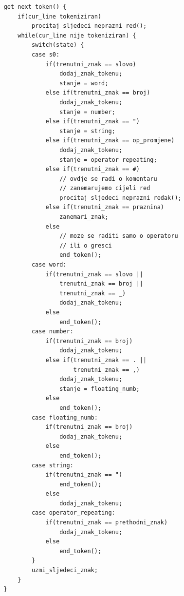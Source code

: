 \documentclass[times, utf8, zavrsni]{fer}
\begin{document}
\begin{verbatim}
    get_next_token() {
        if(cur_line tokeniziran)
            procitaj_sljedeci_neprazni_red();
        while(cur_line nije tokeniziran) {
            switch(state) {
            case s0:
                if(trenutni_znak == slovo)
                    dodaj_znak_tokenu;
                    stanje = word;
                else if(trenutni_znak == broj)
                    dodaj_znak_tokenu;
                    stanje = number;
                else if(trenutni_znak == ")
                    stanje = string;
                else if(trenutni_znak == op_promjene)
                    dodaj_znak_tokenu;
                    stanje = operator_repeating;
                else if(trenutni_znak == #)
                    // ovdje se radi o komentaru
                    // zanemarujemo cijeli red
                    procitaj_sljedeci_neprazni_redak(); 
                else if(trenutni_znak == praznina)
                    zanemari_znak;
                else
                    // moze se raditi samo o operatoru
                    // ili o gresci
                    end_token();
            case word:
                if(trenutni_znak == slovo ||
                    trenutni_znak == broj ||
                    trenutni_znak == _)
                    dodaj_znak_tokenu;
                else
                    end_token();
            case number:
                if(trenutni_znak == broj)
                    dodaj_znak_tokenu;
                else if(trenutni_znak == . ||
                        trenutni_znak == ,)
                    dodaj_znak_tokenu;
                    stanje = floating_numb;
                else
                    end_token();
            case floating_numb:
                if(trenutni_znak == broj)
                    dodaj_znak_tokenu;
                else
                    end_token();
            case string:  
                if(trenutni_znak == ")
                    end_token();
                else
                    dodaj_znak_tokenu;
            case operator_repeating:
                if(trenutni_znak == prethodni_znak)
                    dodaj_znak_tokenu;
                else
                    end_token();
            }
            uzmi_sljedeci_znak;
        }
    }


\end{verbatim}
\end{document}
